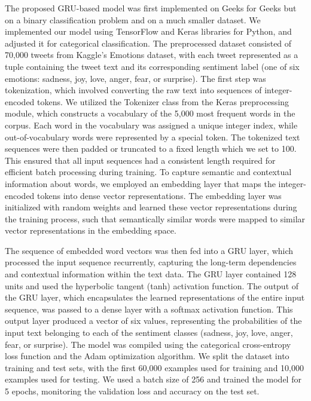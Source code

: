 \documentclass[11pt]{article}
\begin{document}
The proposed GRU-based model was first implemented on Geeks for Geeks but on a binary classification problem and on a much smaller dataset. We implemented our model using TensorFlow and Keras libraries for Python, and adjusted it for categorical classification. The preprocessed dataset consisted of 70,000 tweets from Kaggle's Emotions dataset, with each tweet represented as a tuple containing the tweet text and its corresponding sentiment label (one of six emotions: sadness, joy, love, anger, fear, or surprise). The first step was tokenization, which involved converting the raw text into sequences of integer-encoded tokens. We utilized the Tokenizer class from the Keras preprocessing module, which constructs a vocabulary of the 5,000 most frequent words in the corpus. Each word in the vocabulary was assigned a unique integer index, while out-of-vocabulary words were represented by a special token. The tokenized text sequences were then padded or truncated to a fixed length which we set to 100. This ensured that all input sequences had a consistent length required for efficient batch processing during training. To capture semantic and contextual information about words, we employed an embedding layer that maps the integer-encoded tokens into dense vector representations. The embedding layer was initialized with random weights and learned these vector representations during the training process, such that semantically similar words were mapped to similar vector representations in the embedding space.

The sequence of embedded word vectors was then fed into a GRU layer, which processed the input sequence recurrently, capturing the long-term dependencies and contextual information within the text data. The GRU layer contained 128 units and used the hyperbolic tangent (tanh) activation function. The output of the GRU layer, which encapsulates the learned representations of the entire input sequence, was passed to a dense layer with a softmax activation function. This output layer produced a vector of six values, representing the probabilities of the input text belonging to each of the sentiment classes (sadness, joy, love, anger, fear, or surprise). The model was compiled using the categorical cross-entropy loss function and the Adam optimization algorithm. We split the dataset into training and test sets, with the first 60,000 examples used for training and 10,000 examples used for testing. We used a batch size of 256 and trained the model for 5 epochs, monitoring the validation loss and accuracy on the test set.
\end{document}
